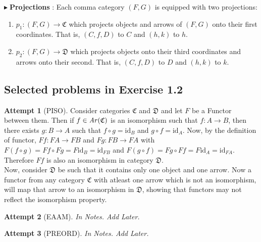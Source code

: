 \documentclass{article}
\theoremstyle{definition}
\theoremstyle{remark}
\theoremstyle{definition}
\theoremstyle{definition}
\theoremstyle{definition}
\newtheorem*{attempt}{Attempt}
\newcommand{\cat}[1]{\mathfrak{#1}}
\newcommand{\arr}[1]{\text{\textit{Ar}}(#1)}
\newcommand{\Id}[1]{\text{id}_{#1}}
\newcommand{\point}[0]{$\blacktriangleright\;$}
\begin{document}
\point \textbf{Projections} : Each comma category $ (F,G) $ is equipped with two projections:
\begin{enumerate}
	\item {$ p_1 : (F,G) \to \cat{C} $ which projects objects and arrows of $ (F,G) $ onto their first coordinates. That is, $ (C,f,D) $ to $ C $ and $ (h,k) $ to $ h $.}
	\item {$ p_2 : (F,G)  \to \cat{D}$ which projects objects onto their third coordinates and arrows onto their second. That is, $ (C,f,D) $ to $ D $ and $ (h,k) $ to $ k $.}
\end{enumerate}

\hrulefill 
\subsection{Selected problems in Exercise 1.2}
\begin{attempt}[PISO]
	Consider categories $ \cat{C} $ and $ \cat{D} $ and let $ F $ be a Functor between them. Then if $ f\in \arr{\cat{C}} $ is an isomorphism such that $ f: A\to B $, then there exists $ g : B\to A $ such that $ f\circ g = \Id{B} $ and $ g\circ f = \Id{A} $. Now, by the definition of functor, $ Ff : FA\to FB $ and $ Fg : FB\to FA $ with $ F(f\circ g) = Ff\circ Fg = F\Id{B} = \Id{FB} $ and $ F(g\circ f) = Fg\circ Ff = F\Id{A} = \Id{FA} $. Therefore $ Ff $ is also an isomorphism in category $ \cat{D} $.\\
	Now, consider $ \cat{D} $ be such that it contains only one object and one arrow. Now a functor from any category $ \cat{C} $ with atleast one arrow which is not an isomorphism, will map that arrow to an isomorphism in $ \cat{D} $, showing that functors may not reflect the isomorphism property.
\end{attempt}
\begin{attempt}[EAAM] \emph{In Notes. Add Later.}
	
\end{attempt}
\begin{attempt}[PREORD]
	\emph{In Notes. Add Later.}
\end{attempt}
\hrulefill
\newpage
\end{document}
